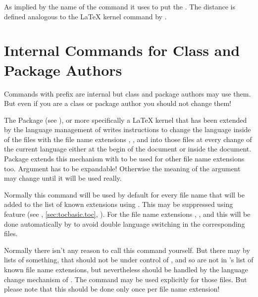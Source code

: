 As implied by the name of the command it uses  to put the
. The distance is defined analogous to the \LaTeX{} kernel
command  by
.%
\EndIndexGroup
\EndIndexGroup


\section{Internal Commands for Class and Package Authors}
\label{sec:tocbasic.internals}

Commands with prefix  are internal but class and package
authors may use them. But even if you are a class or package author you
should not change them!

\begin{Declaration}
\end{Declaration}
The Package  (see \cite{package:babel}),
or more specifically a \LaTeX{} kernel that has been extended by the language
management of  writes instructions to change the language
inside of the files with the file name extensions , , and
 into those files at every change of the current language either at
the begin of the document or inside the document. Package 
extends this mechanism with  to be used for other
file name extensions too. Argument  has to be expandable!
Otherwise the meaning of the argument may change until it will be used really.

Normally this command will be used by default for every file name
 that will be added to the list of known extensions using
. This may be suppressed using feature
 (see ,
\autoref{sec:tocbasic.toc}, ). For the
file name extensions , , and  this will be done
automatically by  to avoid double language switching in the
corresponding files.

Normally there isn't any reason to call this command yourself. But there may
by lists of something, that should not be under control of ,
and so are not in 's list of known file name extensions, but
nevertheless should be handled by the language change mechanism of
. The command may be used explicitly for those files. But please
note that this should be done only once per file name extension!%
\EndIndexGroup


